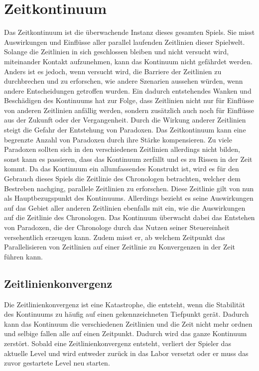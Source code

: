 \section{Zeitkontinuum}
Das Zeitkontinuum ist die überwachende Instanz dieses gesamten Spiels. Sie misst Auswirkungen und Einflüsse aller parallel laufenden Zeitlinien dieser Spielwelt. Solange die Zeitlinien in sich geschlossen bleiben und nicht versucht wird, miteinander Kontakt aufzunehmen, kann das Kontinuum nicht gefährdet werden. Anders ist es jedoch, wenn versucht wird, die Barriere der Zeitlinien zu durchbrechen und zu erforschen, wie andere Szenarien aussehen würden, wenn andere Entscheidungen getroffen wurden. Ein dadurch entstehendes Wanken und Beschädigen des Kontinuums hat zur Folge, dass Zeitlinien nicht nur für Einflüsse von anderen Zeitlinien anfällig werden, sondern zusätzlich auch noch für Einflüsse aus der Zukunft oder der Vergangenheit. Durch die Wirkung anderer Zeitlinien steigt die Gefahr der Entstehung von Paradoxen. Das Zeitkontinuum kann eine begrenzte Anzahl von Paradoxen durch ihre Stärke kompensieren. Zu viele Paradoxen sollten sich in den verschiedenen Zeitlinien allerdings nicht bilden, sonst kann es passieren, dass das Kontinuum zerfällt und es zu Rissen in der Zeit kommt. Da das Kontinuum ein allumfassendes Konstrukt ist, wird es für den Gebrauch dieses Spiels die Zeitlinie des Chronologen betrachten, welcher dem Bestreben nachging, parallele Zeitlinien zu erforschen. Diese Zeitlinie gilt von nun als Hauptbezugspunkt des Kontinuums. Allerdings bezieht es seine Auswirkungen auf das Gebiet aller anderen Zeitlinien ebenfalls mit ein, wie die Auswirkungen auf die Zeitlinie des Chronologen. Das Kontinuum überwacht dabei das Entstehen von Paradoxen, die der Chronologe durch das Nutzen seiner Steuereinheit versehentlich erzeugen kann. Zudem misst er, ab welchem Zeitpunkt das Parallelisieren von Zeitlinien auf einer Zeitlinie zu Konvergenzen in der Zeit führen kann.

\subsection{Zeitlinienkonvergenz}\label{sec:konvergenz}
Die Zeitlinienkonvergenz ist eine Katastrophe, die entsteht, wenn die Stabilität des Kontinuums zu häufig auf einen gekennzeichneten Tiefpunkt gerät. Dadurch kann das Kontinuum die verschiedenen Zeitlinien und die Zeit nicht mehr ordnen und selbige fallen alle auf einen Zeitpunkt. Dadurch wird das ganze Kontinuum zerstört. Sobald eine Zeitlinienkonvergenz entsteht, verliert der Spieler das aktuelle Level und wird entweder zurück in das Labor versetzt oder er muss das zuvor gestartete Level neu starten.

